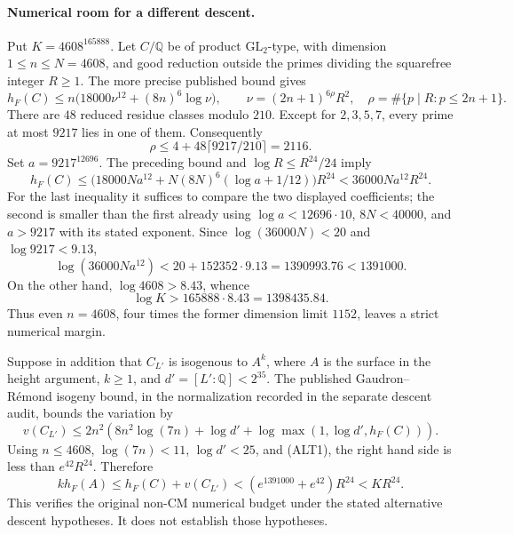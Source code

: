 \paragraph{Numerical room for a different descent.}
Put $K=4608^{165888}$. Let $C/\mathbb Q$ be of product
$\mathrm{GL}_2$-type, with dimension $1\leq n\leq N=4608$, and good
reduction outside the primes dividing the squarefree integer $R\geq1$.
The more precise published bound
\cite[(6.7), p.~19]{vonKaenel2021} gives
\[
 h_F(C)\leq n\bigl(18000\nu^{12}+(8n)^6\log\nu\bigr),\qquad
 \nu=(2n+1)^{6\rho}R^2,
 \quad\rho=\#\{p\mid R:p\leq2n+1\}.
\]
There are $48$ reduced residue classes modulo $210$. Except for
$2,3,5,7$, every prime at most $9217$ lies in one of them. Consequently
\[
 \rho\leq4+48\lceil9217/210\rceil=2116.
\]
Set $a=9217^{12696}$. The preceding bound and
$\log R\leq R^{24}/24$ imply
\[
 h_F(C)\leq
 \bigl(18000Na^{12}+N(8N)^6(\log a+1/12)\bigr)R^{24}
 < 36000Na^{12}R^{24}.
\]
For the last inequality it suffices to compare the two displayed
coefficients; the second is smaller than the first already using
$\log a<12696\cdot10$, $8N<40000$, and $a>9217$ with its stated
exponent. Since $\log(36000N)<20$ and $\log9217<9.13$,
\[
 \log(36000Na^{12})<20+152352\cdot9.13
 =1390993.76<1391000.
\tag{ALT1}
\]
On the other hand, $\log4608>8.43$, whence
\[
 \log K>165888\cdot8.43=1398435.84.
\tag{ALT2}
\]
Thus even $n=4608$, four times the former dimension limit $1152$,
leaves a strict numerical margin.

Suppose in addition that $C_{L'}$ is isogenous to $A^k$, where $A$
is the surface in the height argument, $k\geq1$, and
$d'=[L':\mathbb Q]<2^{35}$. The published Gaudron--R\'emond
isogeny bound, in the normalization recorded in the separate descent
audit, bounds the variation by
\[
 v(C_{L'})\leq2n^2\left(8n^2\log(7n)+\log d'
 +\log\max(1,\log d',h_F(C))\right).
\]
Using $n\leq4608$, $\log(7n)<11$, $\log d'<25$, and (ALT1),
the right hand side is less than $e^{42}R^{24}$. Therefore
\[
 kh_F(A)\leq h_F(C)+v(C_{L'})
 <(e^{1391000}+e^{42})R^{24}<K R^{24}.
\tag{ALT3}
\]
This verifies the original non-CM numerical budget under the stated
alternative descent hypotheses. It does not establish those hypotheses.

